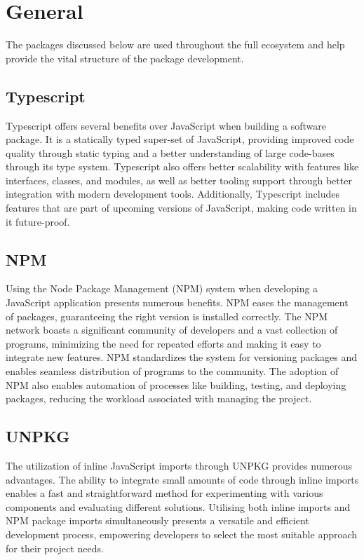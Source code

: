 \documentclass{l4proj}
\begin{document}
\section{General}

The packages discussed below are used throughout the full ecosystem and help provide the vital structure of the package development.

\subsection{Typescript}
\text Typescript offers several benefits over JavaScript when building a software package. It is a statically typed super-set of JavaScript, providing improved code quality through static typing and a better understanding of large code-bases through its type system. Typescript also offers better scalability with features like interfaces, classes, and modules, as well as better tooling support through better integration with modern development tools. Additionally, Typescript includes features that are part of upcoming versions of JavaScript, making code written in it future-proof.

\subsection{NPM}
\text Using the Node Package Management (NPM) system when developing a JavaScript application presents numerous benefits. NPM eases the management of packages, guaranteeing the right version is installed correctly. The NPM network boasts a significant community of developers and a vast collection of programs, minimizing the need for repeated efforts and making it easy to integrate new features. NPM standardizes the system for versioning packages and enables seamless distribution of programs to the community. The adoption of NPM also enables automation of processes like building, testing, and deploying packages, reducing the workload associated with managing the project.


\subsection{UNPKG}
\text The utilization of inline JavaScript imports through UNPKG provides numerous advantages. The ability to integrate small amounts of code through inline imports enables a fast and straightforward method for experimenting with various components and evaluating different solutions. Utilising both inline imports and NPM package imports simultaneously presents a versatile and efficient development process, empowering developers to select the most suitable approach for their project needs.
\end{document}
